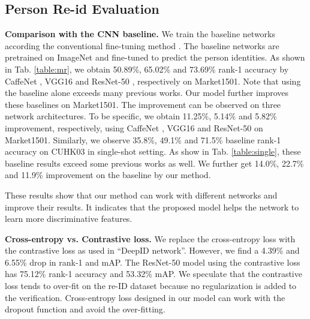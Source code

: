 \documentclass[journal]{IEEEtran}
\begin{document}
\subsection{Person Re-id Evaluation}

\textbf{Comparison with the CNN baseline.} We train the baseline networks according the conventional fine-tuning method \cite{zheng2016person,zheng2016survey}. The baseline networks are pretrained on ImageNet \cite{russakovsky2015imagenet} and fine-tuned to predict the person identities. As shown in Tab. \ref{table:mr}, we obtain 50.89\%, 65.02\% and 73.69\% rank-1 accuracy by CaffeNet \cite{krizhevsky2012imagenet}, VGG16 \cite{simonyan2014very} and ResNet-50 \cite{he2016deep}, respectively on Market1501. Note that using the baseline alone exceeds many previous works. Our model further improves these baselines on Market1501. The improvement can be observed on three network architectures. To be specific, we obtain 11.25\%, 5.14\% and 5.82\% improvement, respectively, using CaffeNet \cite{krizhevsky2012imagenet}, VGG16 \cite{simonyan2014very} and ResNet-50 \cite{he2016deep} on Market1501. Similarly, we observe 35.8\%, 49.1\% and 71.5\% baseline rank-1 accuracy on CUHK03 in single-shot setting. As show in Tab. \ref{table:single}, these baseline results exceed some previous works as well. We further get 14.0\%, 22.7\% and 11.9\% improvement on the baseline by our method.

These results show that our method can work with different networks and improve their results. It indicates that the proposed model helps the network to learn more discriminative features.  

\textbf{Cross-entropy vs. Contrastive loss.} We replace the cross-entropy loss with the contrastive loss as used in ``DeepID network''. However, we find a 4.39\% and 6.55\% drop in rank-1 and mAP. The ResNet-50 model using the contrastive loss has 75.12\% rank-1 accuracy and 53.32\% mAP. We speculate that the contrastive loss tends to over-fit on the re-ID dataset because no regularization is added to the verification. Cross-entropy loss designed in our model can work with the dropout function and avoid the over-fitting.
\end{document}
